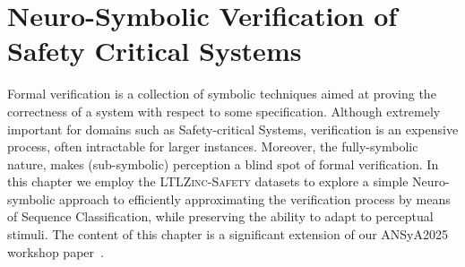 \chapter{Neuro-Symbolic Verification of Safety Critical Systems}
\label{chap:ansya}

Formal verification is a collection of symbolic techniques aimed at proving the correctness of a system with respect to some specification. Although extremely important for domains such as Safety-critical Systems, verification is an expensive process, often intractable for larger instances. Moreover, the fully-symbolic nature, makes (sub-symbolic) perception a blind spot of formal verification. In this chapter we employ the \textsc{LTLZinc-Safety} datasets to explore a simple Neuro-symbolic approach to efficiently approximating the verification process by means of Sequence Classification, while preserving the ability to adapt to perceptual stimuli.
%
The content of this chapter is a significant extension of our ANSyA2025 workshop paper~\cite{lorello2025ansya}.

